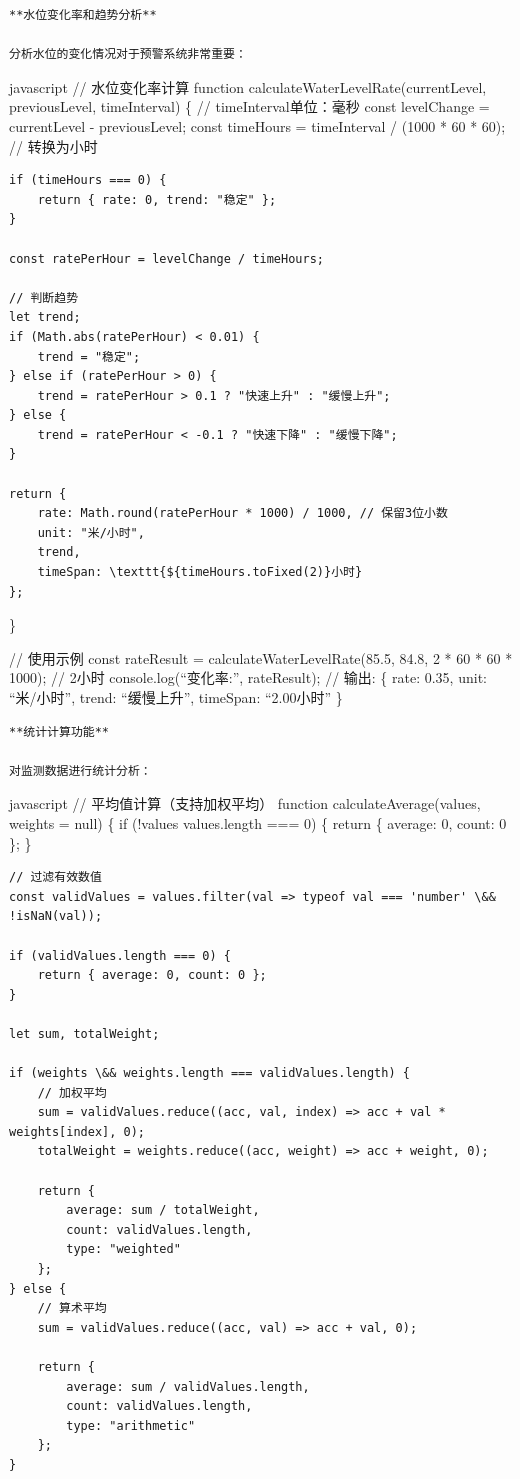 \begin{lstlisting}
**水位变化率和趋势分析**

分析水位的变化情况对于预警系统非常重要：
\end{lstlisting}

javascript // 水位变化率计算 function calculateWaterLevelRate(currentLevel, previousLevel, timeInterval) \{ // timeInterval单位：毫秒 const levelChange = currentLevel - previousLevel; const timeHours = timeInterval / (1000 * 60 * 60); // 转换为小时

\begin{verbatim}
if (timeHours === 0) {
    return { rate: 0, trend: "稳定" };
}

const ratePerHour = levelChange / timeHours;

// 判断趋势
let trend;
if (Math.abs(ratePerHour) < 0.01) {
    trend = "稳定";
} else if (ratePerHour > 0) {
    trend = ratePerHour > 0.1 ? "快速上升" : "缓慢上升";
} else {
    trend = ratePerHour < -0.1 ? "快速下降" : "缓慢下降";
}

return {
    rate: Math.round(ratePerHour * 1000) / 1000, // 保留3位小数
    unit: "米/小时",
    trend,
    timeSpan: \texttt{${timeHours.toFixed(2)}小时}
};
\end{verbatim}

\}

// 使用示例 const rateResult = calculateWaterLevelRate(85.5, 84.8, 2 * 60 * 60 * 1000); // 2小时 console.log(``变化率:'', rateResult); // 输出: \{ rate: 0.35, unit: ``米/小时'', trend: ``缓慢上升'', timeSpan: ``2.00小时'' \}

\begin{lstlisting}
**统计计算功能**

对监测数据进行统计分析：
\end{lstlisting}

javascript // 平均值计算（支持加权平均） function calculateAverage(values, weights = null) \{ if (!values \textbar\textbar{} values.length === 0) \{ return \{ average: 0, count: 0 \}; \}

\begin{verbatim}
// 过滤有效数值
const validValues = values.filter(val => typeof val === 'number' \&& !isNaN(val));

if (validValues.length === 0) {
    return { average: 0, count: 0 };
}

let sum, totalWeight;

if (weights \&& weights.length === validValues.length) {
    // 加权平均
    sum = validValues.reduce((acc, val, index) => acc + val * weights[index], 0);
    totalWeight = weights.reduce((acc, weight) => acc + weight, 0);
    
    return {
        average: sum / totalWeight,
        count: validValues.length,
        type: "weighted"
    };
} else {
    // 算术平均
    sum = validValues.reduce((acc, val) => acc + val, 0);
    
    return {
        average: sum / validValues.length,
        count: validValues.length,
        type: "arithmetic"
    };
}
\end{verbatim}

